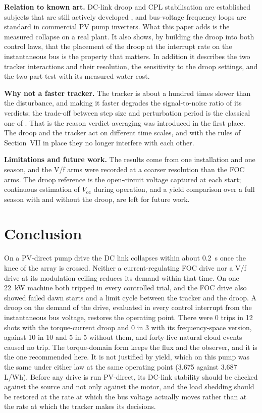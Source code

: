 \documentclass[journal]{IEEEtran}
\begin{document}
\textbf{Relation to known art.} DC-link droop and CPL stabilisation are established subjects that are still actively developed \cite{r13,r14,r15,r16,r17,r18,r19,r22}, and bus-voltage frequency loops are standard in commercial PV pump inverters. What this paper adds is the measured collapse on a real plant. It also shows, by building the droop into both control laws, that the placement of the droop at the interrupt rate on the instantaneous bus is the property that matters. In addition it describes the two tracker interactions and their resolution, the sensitivity to the droop settings, and the two-part test with its measured water cost.

\textbf{Why not a faster tracker.} The tracker is about a hundred times slower than the disturbance, and making it faster degrades the signal-to-noise ratio of its verdicts; the trade-off between step size and perturbation period is the classical one of \cite{r23}. That is the reason verdict averaging was introduced in the first place. The droop and the tracker act on different time scales, and with the rules of Section~VII in place they no longer interfere with each other.

\textbf{Limitations and future work.} The results come from one installation and one season, and the V/f arms were recorded at a coarser resolution than the FOC arms. The droop reference is the open-circuit voltage captured at each start; continuous estimation of $V_{\mathrm{oc}}$ during operation, and a yield comparison over a full season with and without the droop, are left for future work.

\section{Conclusion}

On a PV-direct pump drive the DC link collapses within about 0.2~s once the knee of the array is crossed. Neither a current-regulating FOC drive nor a V/f drive at its modulation ceiling reduces its demand within that time. On one 22~kW machine both tripped in every controlled trial, and the FOC drive also showed failed dawn starts and a limit cycle between the tracker and the droop. A droop on the demand of the drive, evaluated in every control interrupt from the instantaneous bus voltage, restores the operating point. There were 0 trips in 12 shots with the torque-current droop and 0 in 3 with its frequency-space version, against 10 in 10 and 5 in 5 without them, and forty-five natural cloud events caused no trip. The torque-domain form keeps the flux and the observer, and it is the one recommended here. It is not justified by yield, which on this pump was the same under either law at the same operating point (3.675 against 3.687 L/Wh). Before any drive is run PV-direct, its DC-link stability should be checked against the source and not only against the motor, and the load shedding should be restored at the rate at which the bus voltage actually moves rather than at the rate at which the tracker makes its decisions.
\end{document}
